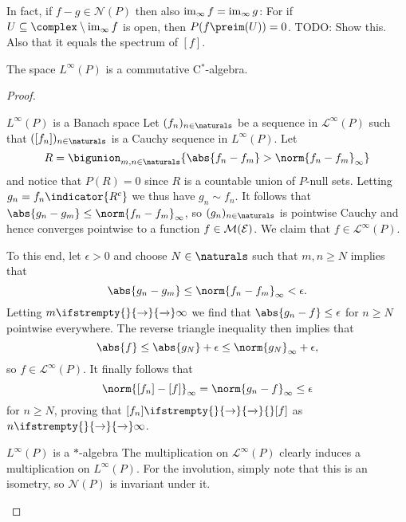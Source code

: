 \documentclass[article, a4paper, 11pt, oneside]{memoir}
\numberwithin{equation}{chapter}
\newcommand{\calE}{\mathcal{E}}
\newcommand{\calN}{\mathcal{N}}
\newcommand{\calL}{\mathcal{L}}
\renewcommand\to[1][]{%
    \ifstrempty{#1}{%
        \rightarrow
    }{%
        \xrightarrow[#1]{}
    }%
}
\begin{document}
In fact, if $f - g \in \calN(P)$ then also $\operatorname{im}_\infty f = \operatorname{im}_\infty g$: For if $U \subseteq \complex \setminus \essran f$ is open, then $P(f\preim(U)) = 0$. TODO: Show this. Also that it equals the spectrum of $[f]$.


\begin{theorem}
    The space $L^\infty(P)$ is a commutative C$^*$-algebra.
\end{theorem}

\begin{proof}
\begin{proofsec}
    \item[$L^\infty(P)$ is a Banach space]
    Let $(f_n)_{n\in\naturals}$ be a sequence in $\calL^\infty(P)$ such that $([f_n])_{n\in\naturals}$ is a Cauchy sequence in $L^\infty(P)$. Let
    \begin{equation*}
        R
            = \bigunion_{m,n\in\naturals} \{ \abs{f_n - f_m} > \norm{f_n - f_m}_\infty \}
    \end{equation*}
    and notice that $P(R) = 0$ since $R$ is a countable union of $P$-null sets. Letting $g_n = f_n \indicator{R^c}$ we thus have $g_n \sim f_n$. It follows that $\abs{g_n - g_m} \leq \norm{f_n - f_m}_\infty$, so $(g_n)_{n\in\naturals}$ is pointwise Cauchy and hence converges pointwise to a function $f \in \meas{\calE}$. We claim that $f \in \calL^\infty(P)$.

    To this end, let $\epsilon > 0$ and choose $N \in \naturals$ such that $m,n \geq N$ implies that
    \begin{equation*}
        \abs{g_n - g_m}
            \leq \norm{f_n - f_m}_\infty
            < \epsilon.
    \end{equation*}
    Letting $m \to \infty$ we find that $\abs{g_n - f} \leq \epsilon$ for $n \geq N$ pointwise everywhere. The reverse triangle inequality then implies that
    \begin{equation*}
        \abs{f}
            \leq \abs{g_N} + \epsilon
            \leq \norm{g_N}_\infty + \epsilon,
    \end{equation*}
    so $f \in \calL^\infty(P)$. It finally follows that
    \begin{equation*}
        \norm{[f_n] - [f]}_\infty
            = \norm{g_n - f}_\infty
            \leq \epsilon
    \end{equation*}
    for $n \geq N$, proving that $[f_n] \to{} [f]$ as $n \to \infty$.

    \item[$L^\infty(P)$ is a $*$-algebra]
    The multiplication on $\calL^\infty(P)$ clearly induces a multiplication on $L^\infty(P)$. For the involution, simply note that this is an isometry, so $\calN(P)$ is invariant under it.


\end{proofsec}
\end{proof}
\end{document}
